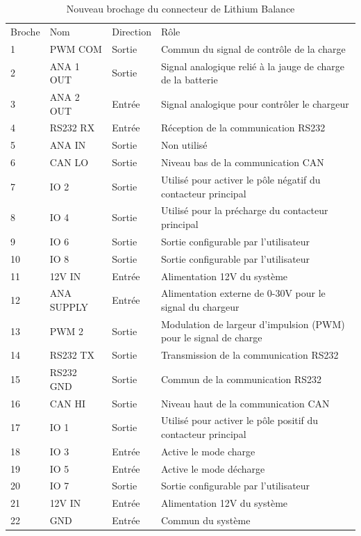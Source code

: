 	\begin{table}[H]
		\centering
		\caption{Nouveau brochage du connecteur de Lithium Balance}
		\label{22CLithiumBalance}	
		\renewcommand{\arraystretch}{1.3}
		\begin{tabular}{ | l | l | l | l | }
			\hline
			Broche & Nom & Direction & Rôle \\ \hhline{|=|=|=|=|}
			1 & PWM COM & Sortie & Commun du signal de contrôle de la charge \\ \hline
			2 & ANA 1 OUT & Sortie & Signal analogique relié à la jauge de charge de la batterie \\ \hline
			3 & ANA 2 OUT & Entrée & Signal analogique pour contrôler le chargeur \\ \hline
			4 & RS232 RX & Entrée & Réception de la communication RS232 \\ \hline
			5 & ANA IN & Sortie & Non utilisé \\ \hline
			6 & CAN LO & Sortie & Niveau bas de la communication CAN \\ \hline
			7 & IO 2 & Sortie & Utilisé pour activer le pôle négatif du contacteur principal \\ \hline
			8 & IO 4 & Sortie & Utilisé pour la précharge du contacteur principal \\ \hline
			9 & IO 6 & Sortie & Sortie configurable par l'utilisateur \\ \hline
			10 & IO 8 & Sortie & Sortie configurable par l'utilisateur \\ \hline
			11 & 12V IN & Entrée & Alimentation 12V du système \\ \hline
			12 & ANA SUPPLY & Entrée & Alimentation externe de 0-30V pour le signal du chargeur \\ \hline
			13 & PWM 2 & Sortie & Modulation de largeur d'impulsion (PWM) pour le signal de charge \\ \hline
			14 & RS232 TX & Sortie & Transmission de la communication RS232 \\ \hline
			15 & RS232 GND & Sortie & Commun de la communication RS232 \\ \hline
			16 & CAN HI & Sortie & Niveau haut de la communication CAN \\ \hline
			17 & IO 1  & Sortie & Utilisé pour activer le pôle positif du contacteur principal \\ \hline
			18 & IO 3 & Entrée & Active le mode charge \\ \hline
			19 & IO 5 & Entrée & Active le mode décharge \\ \hline
			20 & IO 7 & Sortie & Sortie configurable par l'utilisateur \\ \hline
			21 & 12V IN & Entrée & Alimentation 12V du système \\ \hline
			22 & GND & Entrée & Commun du système \\ \hline
		\end{tabular}			
	\end{table}

